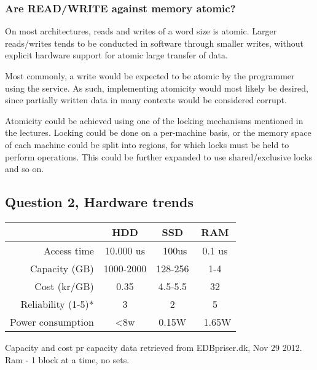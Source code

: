 \documentclass[11pt,a4paper]{article}
\begin{document}
\subsubsection{Are READ/WRITE against memory atomic?}
On most architectures, reads and writes of a word size is atomic. Larger 
reads/writes tends to be conducted in software through smaller writes,
without explicit hardware support for atomic large transfer of data.

Most commonly, a write would be expected to be atomic by the programmer using
the service. As such, implementing atomicity would most likely be desired, since
partially written data in many contexts would be considered corrupt.

Atomicity could be achieved using one of the locking mechanisms mentioned
in the lectures. Locking could be done on a per-machine basis, or the
memory space of each machine could be split into regions, for which locks
must be held to perform operations. This could be further expanded to use
shared/exclusive locks and so on.

\subsection{Question 2, Hardware trends}

\begin{tabular}{|r|c|c|c|}
    \hline
                    & HDD & SSD & RAM\\\hline
    Access time     & 10.000 us & ~100us & 0.1 us\\\hline %
    Capacity (GB)   & 1000-2000 & 128-256 & 1-4 \\\hline
    Cost (kr/GB)    & 0.35 & 4.5-5.5 & 32 \\\hline
    Reliability (1-5)*& 3 & 2 & 5\\\hline %
    Power consumption & <8w & 0.15W & ~1.65W \\\hline 

\end{tabular}
Capacity and cost pr capacity data retrieved from EDBpriser.dk, Nov 29 2012.
Ram - 1 block at a time, no sets.
\end{document}
